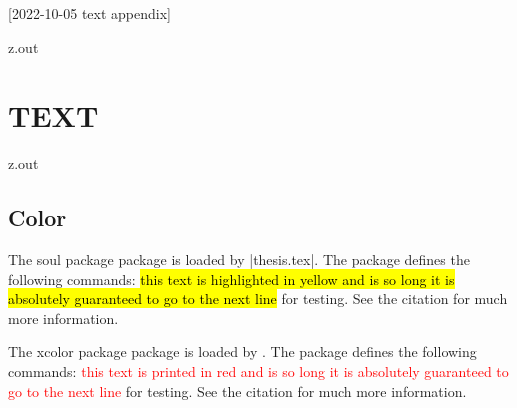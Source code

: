 [2022-10-05 text appendix]

\begin{VerbatimOut}{z.out}
\chapter{TEXT}

\end{VerbatimOut}

\MyIO


\begin{VerbatimOut}{z.out}


\section{Color}

The soul package \cite{franz2003} package is loaded by |thesis.tex|.
The package defines the following commands:
\hl{%
  this text is highlighted in yellow
  and is so long it is absolutely guaranteed
  to go to the next line%
} for testing.
See the citation for much more information.

The xcolor package \cite{kern2021} package is loaded by \PurdueThesisLogo.
The package defines the following commands:
\textcolor{red}{%
  this text is printed in red
  and is so long it is absolutely guaranteed
  to go to the next line%
} for testing.
See the citation for much more information.
\end{VerbatimOut}

\MyIO
  

